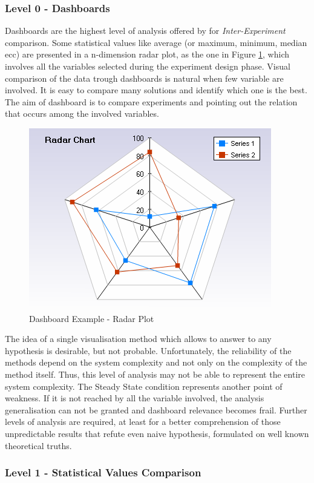 \subsubsection{Level 0 - Dashboards}\label{sec:heaven-level0}

Dashboards are the highest level of analysis offered by \name for \textit{Inter-Experiment} comparison. Some statistical values like average (or maximum, minimum, median ecc) are presented in a n-dimension radar plot, as the one in Figure \ref{fig:radar}, which involves all the variables selected during the experiment design phase. Visual comparison of the data trough dashboards is natural when few variable are involved. It is easy to compare many solutions and identify which one is the best. The aim of dashboard is to compare experiments and pointing out the relation that occurs among the involved variables.

\begin{figure}[tbh]
  \centering
	\includegraphics[width=0.5\linewidth]{images/radar}
	\caption{Dashboard Example - Radar Plot} 	
  	\label{fig:radar}
\end{figure}

The idea of a single visualisation method which allows to answer to any hypothesis is desirable, but not probable.  Unfortunately, the reliability of the methods depend on the system complexity and not only on the complexity of the method itself. Thus, this level of analysis may not be able to represent the entire system complexity. The Steady State condition represents another point of weakness. If it is not reached by all the variable involved, the analysis generalisation can not be granted and dashboard relevance becomes frail. Further levels of analysis are required, at least for a better comprehension of those unpredictable results that refute even naive hypothesis, formulated on well known theoretical truths.


\subsubsection{Level 1 -  Statistical Values Comparison}\label{sec:heaven-level1}

